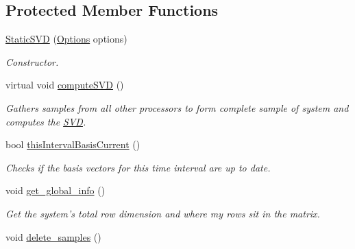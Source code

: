 \subsection*{Protected Member Functions}
\begin{DoxyCompactItemize}
\item 
\hyperlink{class_c_a_r_o_m_1_1_static_s_v_d_a7db32fa4778422244a7b5230f9b7481f}{Static\-S\-V\-D} (\hyperlink{class_c_a_r_o_m_1_1_options}{Options} options)
\begin{DoxyCompactList}\small\item\em Constructor. \end{DoxyCompactList}\item 
\hypertarget{class_c_a_r_o_m_1_1_static_s_v_d_a84a3a716b20657be429866c873424e3c}{virtual void \hyperlink{class_c_a_r_o_m_1_1_static_s_v_d_a84a3a716b20657be429866c873424e3c}{compute\-S\-V\-D} ()}\label{class_c_a_r_o_m_1_1_static_s_v_d_a84a3a716b20657be429866c873424e3c}

\begin{DoxyCompactList}\small\item\em Gathers samples from all other processors to form complete sample of system and computes the \hyperlink{class_c_a_r_o_m_1_1_s_v_d}{S\-V\-D}. \end{DoxyCompactList}\item 
bool \hyperlink{class_c_a_r_o_m_1_1_static_s_v_d_a8c59671fcd305f798bc3c185b6595345}{this\-Interval\-Basis\-Current} ()
\begin{DoxyCompactList}\small\item\em Checks if the basis vectors for this time interval are up to date. \end{DoxyCompactList}\item 
\hypertarget{class_c_a_r_o_m_1_1_static_s_v_d_a4871175e1c83e6a3013595ffad89e248}{void \hyperlink{class_c_a_r_o_m_1_1_static_s_v_d_a4871175e1c83e6a3013595ffad89e248}{get\-\_\-global\-\_\-info} ()}\label{class_c_a_r_o_m_1_1_static_s_v_d_a4871175e1c83e6a3013595ffad89e248}

\begin{DoxyCompactList}\small\item\em Get the system's total row dimension and where my rows sit in the matrix. \end{DoxyCompactList}\item 
\hypertarget{class_c_a_r_o_m_1_1_static_s_v_d_a48c3bc32b0d15ad95fe9a9966581157a}{void \hyperlink{class_c_a_r_o_m_1_1_static_s_v_d_a48c3bc32b0d15ad95fe9a9966581157a}{delete\-\_\-samples} ()}\label{class_c_a_r_o_m_1_1_static_s_v_d_a48c3bc32b0d15ad95fe9a9966581157a}


\end{DoxyCompactItemize}
